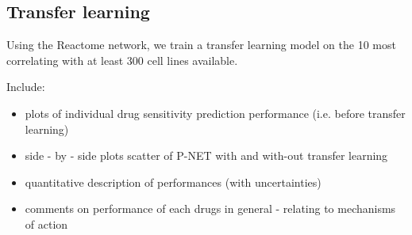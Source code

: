 \documentclass[NOTE, disdraft=true, UKenglish]{\DISCDTLATEXPATH UCLCDTDISdoc}
\begin{document}
\subsection{Transfer learning}
Using the Reactome network, we train a transfer learning model on the 10 most correlating with at least 300 cell lines available.

{   \color{red}
Include:
\begin{itemize}
\item plots of individual drug sensitivity prediction performance (i.e. before transfer learning)
\item side - by - side plots scatter of P-NET with and with-out transfer learning
\item quantitative description of performances (with uncertainties)
\item comments on performance of each drugs in general - relating to mechanisms of action
\end{itemize}}

%
\end{document}
